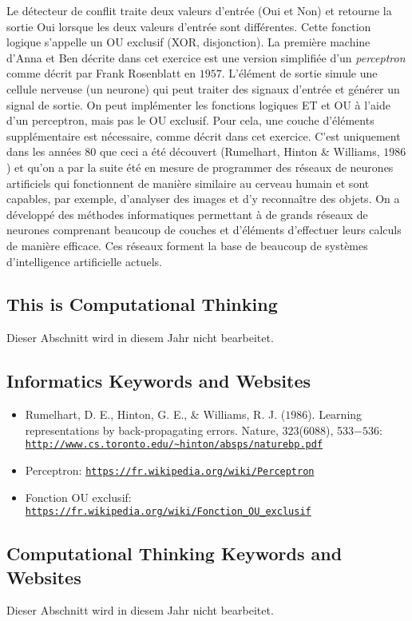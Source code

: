 \documentclass[a4paper,11pt]{report}
\newcommand{\BrochureUrlText}[1]{\texttt{#1}}
\begin{document}
Le détecteur de conflit traite deux valeurs d’entrée (Oui et Non) et retourne la sortie Oui lorsque les deux valeurs d’entrée sont différentes. Cette fonction logique s’appelle un OU exclusif (XOR, disjonction). La première machine d’Anna et Ben décrite dans cet exercice est une version simplifiée d’un \emph{perceptron} comme décrit par Frank Rosenblatt en $1957$. L’élément de sortie simule une cellule nerveuse (un neurone) qui peut traiter des signaux d’entrée et générer un signal de sortie. On peut implémenter les fonctions logiques ET et OU à l’aide d’un perceptron, mais pas le OU exclusif. Pour cela, une couche d’éléments supplémentaire est nécessaire, comme décrit dans cet exercice. C’est uniquement dans les années $80$ que ceci a été découvert (Rumelhart, Hinton \& Williams, $1986$) et qu’on a par la suite été en mesure de programmer des réseaux de neurones artificiels qui fonctionnent de manière similaire au cerveau humain et sont capables, par exemple, d’analyser des images et d’y reconnaître des objets.
On a développé des méthodes informatiques permettant à de grands réseaux de neurones comprenant beaucoup de couches et d’éléments d’effectuer leurs calculs de manière efficace. Ces réseaux forment la base de beaucoup de systèmes d’intelligence artificielle actuels.


\subsection*{This is Computational Thinking}

Dieser Abschnitt wird in diesem Jahr nicht bearbeitet.


\subsection*{Informatics Keywords and Websites}

\begin{itemize}
  \item Rumelhart, D. E., Hinton, G. E., \& Williams, R. J. ($1986$). Learning representations by back-propagating errors. Nature, $323$($6088$), 533$-536$: \href{http://www.cs.toronto.edu/~hinton/absps/naturebp.pdf}{\BrochureUrlText{http://www.cs.toronto.edu/\textasciitilde{}hinton/absps/naturebp.pdf}}
  \item Perceptron: \href{https://fr.wikipedia.org/wiki/Perceptron}{\BrochureUrlText{https://fr.wikipedia.org/wiki/Perceptron}}
  \item Fonction OU exclusif: \href{https://fr.wikipedia.org/wiki/Fonction_OU_exclusif}{\BrochureUrlText{https://fr.wikipedia.org/wiki/Fonction\_OU\_exclusif}}
\end{itemize}


\subsection*{Computational Thinking Keywords and Websites}

Dieser Abschnitt wird in diesem Jahr nicht bearbeitet.
\end{document}
